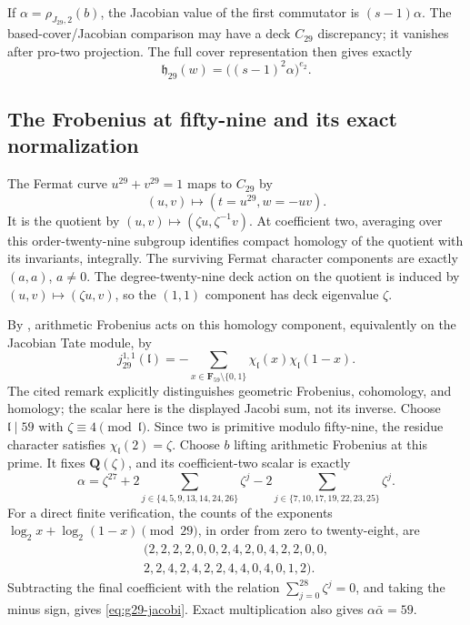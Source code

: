 If \(\alpha=\rho_{J_{29},2}(b)\), the Jacobian value of the first
commutator is \((s-1)\alpha\). The based-cover/Jacobian comparison
may have a deck \(C_{29}\) discrepancy; it vanishes after pro-two
projection. The full cover representation then gives exactly
\begin{equation}\label{eq:g29-word-value}
                  \mathfrak h_{29}(w)=\bigl((s-1)^2\alpha\bigr)^{e_2}.
\end{equation}

\subsection{The Frobenius at fifty-nine and its exact normalization}

The Fermat curve \(u^{29}+v^{29}=1\) maps to \(C_{29}\) by
\[
                             (u,v)\longmapsto(t=u^{29},w=-uv).
\]
It is the quotient by \((u,v)\mapsto(\zeta u,\zeta^{-1}v)\).
At coefficient two, averaging over this order-twenty-nine subgroup
identifies compact homology of the quotient with its invariants,
integrally. The surviving Fermat character components are exactly
\((a,a)\), \(a\ne0\). The degree-twenty-nine deck action on the
quotient is induced by \((u,v)\mapsto(\zeta u,v)\), so the
\((1,1)\) component has deck eigenvalue \(\zeta\).

By \cite[Theorem 8.1 and Remark 8.3, pp.~638--639]{Otsubo2016},
arithmetic Frobenius acts on this homology component, equivalently
on the Jacobian Tate module, by
\[
 j_{29}^{1,1}(\mathfrak l)
       =-\sum_{x\in\mathbf F_{59}\setminus\{0,1\}}
                             \chi_{\mathfrak l}(x)\chi_{\mathfrak l}(1-x).
\]
The cited remark explicitly distinguishes geometric Frobenius,
cohomology, and homology; the scalar here is the displayed Jacobi
sum, not its inverse. Choose \(\mathfrak l\mid59\) with
\(\zeta\equiv4\pmod{\mathfrak l}\). Since two is primitive
modulo fifty-nine, the residue character satisfies
\(\chi_{\mathfrak l}(2)=\zeta\). Choose \(b\) lifting arithmetic
Frobenius at this prime. It fixes \(\mathbf Q(\zeta)\), and its
coefficient-two scalar is exactly
\begin{equation}\label{eq:g29-jacobi}
 \alpha=\zeta^{27}
       +2\sum_{j\in\{4,5,9,13,14,24,26\}}\zeta^j
       -2\sum_{j\in\{7,10,17,19,22,23,25\}}\zeta^j.
\end{equation}
For a direct finite verification, the counts of the exponents
\(\log_2x+\log_2(1-x)\pmod{29}\), in order from zero to
twenty-eight, are
\[
\begin{gathered}
(2,2,2,2,0,0,2,4,2,0,4,2,2,0,0,\\
2,2,4,2,4,2,2,4,4,0,4,0,1,2).
\end{gathered}
\]
Subtracting the final coefficient with the relation
\(\sum_{j=0}^{28}\zeta^j=0\), and taking the minus sign,
gives \eqref{eq:g29-jacobi}. Exact multiplication also gives
\(\alpha\bar\alpha=59\).


